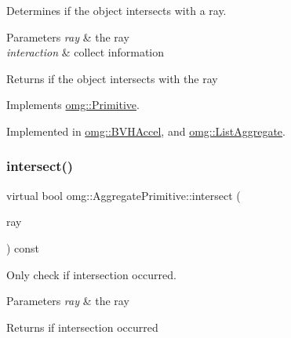 Determines if the object intersects with a ray. 


\begin{DoxyParams}{Parameters}
{\em ray} & the ray \\
\hline
{\em interaction} & collect information \\
\hline
\end{DoxyParams}
\begin{DoxyReturn}{Returns}
if the object intersects with the ray 
\end{DoxyReturn}


Implements \mbox{\hyperlink{classomg_1_1_primitive_a51f78d3f52794ae02e18688dff75414c}{omg\+::\+Primitive}}.



Implemented in \mbox{\hyperlink{classomg_1_1_b_v_h_accel_a368b5156d04fdac833f8c9917f13d91e}{omg\+::\+B\+V\+H\+Accel}}, and \mbox{\hyperlink{classomg_1_1_list_aggregate_a55fdd3b0fa387cb14488b86634b3e877}{omg\+::\+List\+Aggregate}}.

\mbox{\label{classomg_1_1_aggregate_primitive_af6009e1c54b0f2341d78d95afb4268cc}} 
\subsubsection{\texorpdfstring{intersect()}{intersect()}\hspace{0.1cm}{\footnotesize\ttfamily [2/2]}}
{\footnotesize\ttfamily virtual bool omg\+::\+Aggregate\+Primitive\+::intersect (\begin{DoxyParamCaption}\item[{const \mbox{\hyperlink{classomg_1_1_ray}{Ray}} \&}]{ray }\end{DoxyParamCaption}) const\hspace{0.3cm}{\ttfamily [pure virtual]}}



Only check if intersection occurred. 


\begin{DoxyParams}{Parameters}
{\em ray} & the ray \\
\hline
\end{DoxyParams}
\begin{DoxyReturn}{Returns}
if intersection occurred 
\end{DoxyReturn}


